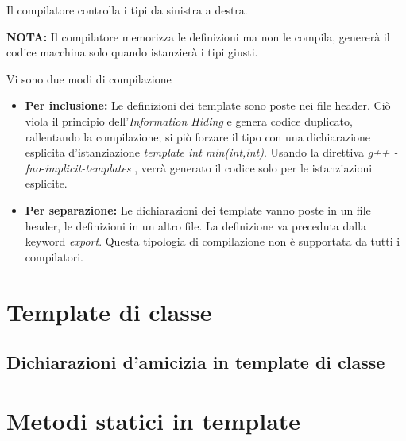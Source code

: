 Il compilatore controlla i tipi da sinistra a destra.

\textbf{NOTA:} Il compilatore memorizza le definizioni ma non le compila, genererà il codice macchina solo quando istanzierà i tipi giusti.

Vi sono due modi di compilazione

\begin{itemize}
	\item \textbf{Per inclusione:} Le definizioni dei template sono poste nei file header. Ciò viola il principio dell'\textit{Information Hiding} e genera codice duplicato, rallentando la compilazione; si piò forzare il tipo con una dichiarazione esplicita d'istanziazione  \textit{template int min(int,int)}. Usando la direttiva \textit{g++ -fno-implicit-templates} , verrà generato il codice solo per le istanziazioni esplicite.
	\item \textbf{Per separazione:} Le dichiarazioni dei template vanno poste in un file header, le definizioni in un altro file. La definizione va preceduta dalla keyword \textit{export}. Questa tipologia di compilazione non è supportata da tutti i compilatori. 
\end{itemize}

\section{Template di classe}



\subsection{Dichiarazioni d'amicizia in template di classe}

\section{Metodi statici in template}